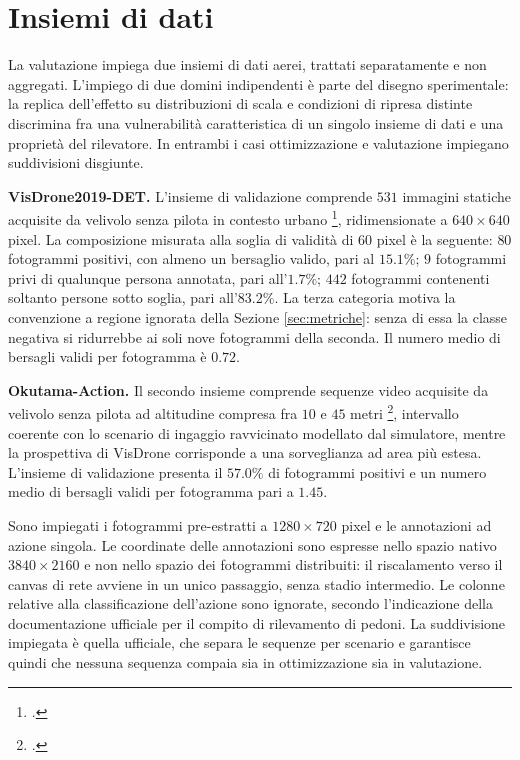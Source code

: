 \documentclass[a4paper,12pt]{report}
\begin{document}
\section{Insiemi di dati}
\label{sec:dataset}

La valutazione impiega due insiemi di dati aerei, trattati separatamente e non
aggregati. L'impiego di due domini indipendenti è parte del disegno
sperimentale: la replica dell'effetto su distribuzioni di scala e condizioni di
ripresa distinte discrimina fra una vulnerabilità caratteristica di un singolo
insieme di dati e una proprietà del rilevatore. In entrambi i casi
ottimizzazione e valutazione impiegano suddivisioni disgiunte.

\textbf{VisDrone2019-DET.}
\label{sec:visdrone}
L'insieme di validazione comprende $531$ immagini statiche acquisite da velivolo
senza pilota in contesto urbano \footcite{zhu_2021_visdrone}, ridimensionate a
$640 \times 640$ pixel. La composizione misurata alla soglia di validità di $60$
pixel è la seguente: $80$ fotogrammi positivi, con almeno un bersaglio valido,
pari al $15.1\%$; $9$ fotogrammi privi di qualunque persona annotata, pari
all'$1.7\%$; $442$ fotogrammi contenenti soltanto persone sotto soglia, pari
all'$83.2\%$. La terza categoria motiva la convenzione a regione ignorata della
Sezione \ref{sec:metriche}: senza di essa la classe negativa si ridurrebbe ai
soli nove fotogrammi della seconda. Il numero medio di bersagli validi per
fotogramma è $0.72$.

\textbf{Okutama-Action.}
\label{sec:okutama}
Il secondo insieme comprende sequenze video acquisite da velivolo senza pilota
ad altitudine compresa fra $10$ e $45$ metri \footcite{barekatain_2017_okutama},
intervallo coerente con lo scenario di ingaggio ravvicinato modellato dal
simulatore, mentre la prospettiva di VisDrone corrisponde a una sorveglianza ad
area più estesa. L'insieme di validazione presenta il $57.0\%$ di fotogrammi
positivi e un numero medio di bersagli validi per fotogramma pari a $1.45$.

Sono impiegati i fotogrammi pre-estratti a $1280 \times 720$ pixel e le
annotazioni ad azione singola. Le coordinate delle annotazioni sono espresse
nello spazio nativo $3840 \times 2160$ e non nello spazio dei fotogrammi
distribuiti: il riscalamento verso il canvas di rete avviene in un unico
passaggio, senza stadio intermedio. Le colonne relative alla classificazione
dell'azione sono ignorate, secondo l'indicazione della documentazione ufficiale
per il compito di rilevamento di pedoni. La suddivisione impiegata è quella
ufficiale, che separa le sequenze per scenario e garantisce quindi che nessuna
sequenza compaia sia in ottimizzazione sia in valutazione.
\end{document}

